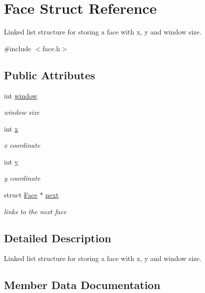 \hypertarget{structFace}{}\section{Face Struct Reference}
\label{structFace}


Linked list structure for storing a face with x, y and window size.  




{\ttfamily \#include $<$face.\+h$>$}

\subsection*{Public Attributes}
\begin{DoxyCompactItemize}
\item 
int \hyperlink{structFace_ad14137f7ed032d76e6c0cdfe43854586}{window}
\begin{DoxyCompactList}\small\item\em window size \end{DoxyCompactList}\item 
int \hyperlink{structFace_a48dccc7c51f71aa8dae21716774ed122}{x}
\begin{DoxyCompactList}\small\item\em x coordinate \end{DoxyCompactList}\item 
int \hyperlink{structFace_a618b931140f2332b17f102e0acea251f}{y}
\begin{DoxyCompactList}\small\item\em y coordinate \end{DoxyCompactList}\item 
struct \hyperlink{structFace}{Face} $\ast$ \hyperlink{structFace_a14dedefeea97ab2adb16dfd611f599e2}{next}
\begin{DoxyCompactList}\small\item\em links to the next face \end{DoxyCompactList}\end{DoxyCompactItemize}


\subsection{Detailed Description}
Linked list structure for storing a face with x, y and window size. 

\subsection{Member Data Documentation}
\hypertarget{structFace_a14dedefeea97ab2adb16dfd611f599e2}{}
